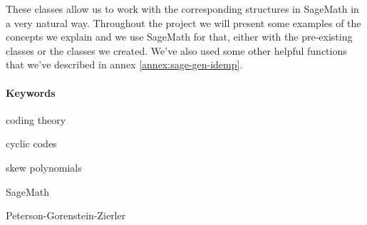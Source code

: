 These classes allow us to work with the corresponding structures in SageMath in a very natural way.
Throughout the project we will present some examples of the concepts we explain and we use SageMath for that, either with the pre-existing classes or the classes we created.
We've also used some other helpful functions that we've described in annex \ref{annex:sage-gen-idemp}.

\paragraph{Keywords}
\begin{itemize*}[label=,itemsep=4em,itemjoin=\hspace{2em}]
  \item coding theory
  \item cyclic codes 
  \item skew polynomials
  \item SageMath
  \item Peterson-Gorenstein-Zierler
\end{itemize*}
